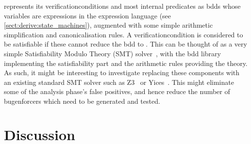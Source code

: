 {\Technique} represents its \glspl{verificationcondition} and most
internal predicates as \glspl{bdd} whose variables are expressions in
the {\StateMachine} expression language (see
\autoref{sect:derive:state_machines}), augmented with some simple
arithmetic simplification and canonicalisation rules.  A
\gls{verificationcondition} is considered to be satisfiable if these
cannot reduce the \gls{bdd} to \false.  This can be thought of as a
very simple Satisfiability Modulo Theory (SMT)
solver~\cite{Barrett2009}, with the \gls{bdd} library implementing the
satisfiability part and the arithmetic rules providing the theory.  As
such, it might be interesting to investigate replacing these
components with an existing standard SMT solver such as
Z3~\cite{Moura2008} or Yices~\cite{Dutertre2006}.  This might
eliminate some of the analysis phase's false positives, and hence
reduce the number of \glspl{bugenforcer} which need to be generated
and tested.

\section{Discussion}

